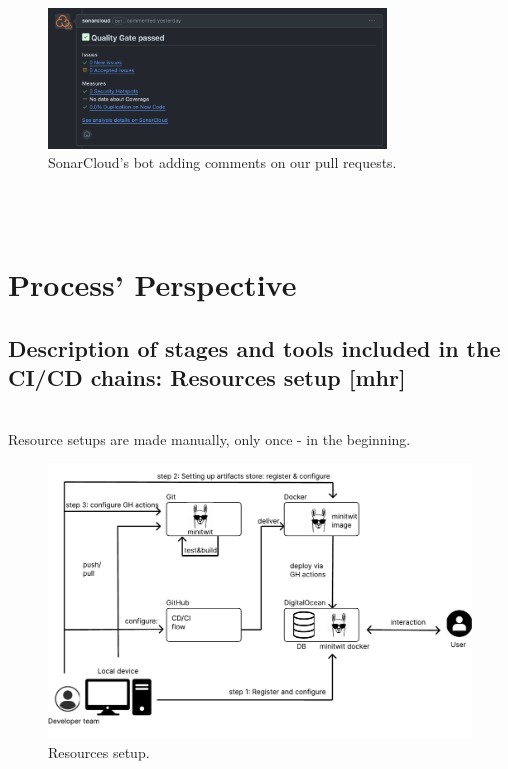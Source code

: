 \documentclass{article}
\begin{document}
\begin{figure}[ht]
    \centering
    \includegraphics[width=0.8\textwidth]{./images/SonarCloud_bot.png}
    \caption{SonarCloud's bot adding comments on our pull requests.}
    \label{fig:notion-dashboard}
\end{figure}
\\\\

\section{Process' Perspective}

\subsection{Description of stages and tools included in the CI/CD chains: Resources setup [mhr]}

\\Resource setups  are made manually, only once - in the beginning.

\begin{figure}[ht]
    \centering
    \includegraphics[width=1.0\textwidth]{./pdfs/resourse setup.pdf} 
    \caption{Resources setup.}
    \label{fig:Resourse setup}
\end{figure}
\end{document}
